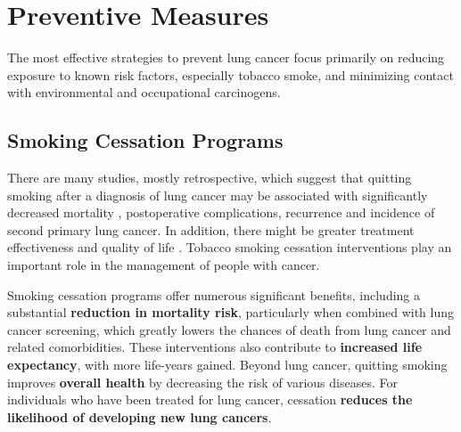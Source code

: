
\section{Preventive Measures}

The most effective strategies to prevent lung cancer focus primarily on reducing exposure to known 
risk factors, especially tobacco smoke, and minimizing contact with environmental and occupational 
carcinogens.


\subsection{Smoking Cessation Programs}

There are many studies, mostly retrospective, which suggest that quitting smoking after a diagnosis 
of lung cancer may be associated with significantly decreased mortality \cite{20093278}, 
postoperative complications, recurrence and incidence of second primary lung cancer. In addition, 
there might be greater treatment effectiveness and quality of life \cite{22244802}. Tobacco smoking 
cessation interventions play an important role in the management of people with cancer.

Smoking cessation programs offer numerous significant benefits, including a substantial 
\textbf{reduction in mortality risk}, particularly when combined with lung cancer screening, which 
greatly lowers the chances of death from lung cancer and related comorbidities. These interventions 
also contribute to \textbf{increased life expectancy}, with more life-years gained. Beyond lung 
cancer, quitting smoking improves \textbf{overall health} by decreasing the risk of various 
diseases. For individuals who have been treated for lung cancer, cessation \textbf{reduces the 
likelihood of developing new lung cancers}. 

